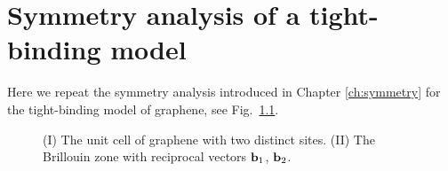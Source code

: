 

\chapter{Symmetry analysis of a tight-binding model} \label{app:tb}

Here we repeat the symmetry analysis introduced in Chapter \ref{ch:symmetry} for the tight-binding model of graphene, see Fig.~\ref{fig:app_graphene}. 

\begin{figure} [h!]
	\centering
	
	\caption{(I) The unit cell of graphene with two distinct sites. (II) The Brillouin zone with reciprocal vectors $\vb{b}_1$, $\vb{b}_2$. }
	\label{fig:app_graphene}
\end{figure}

